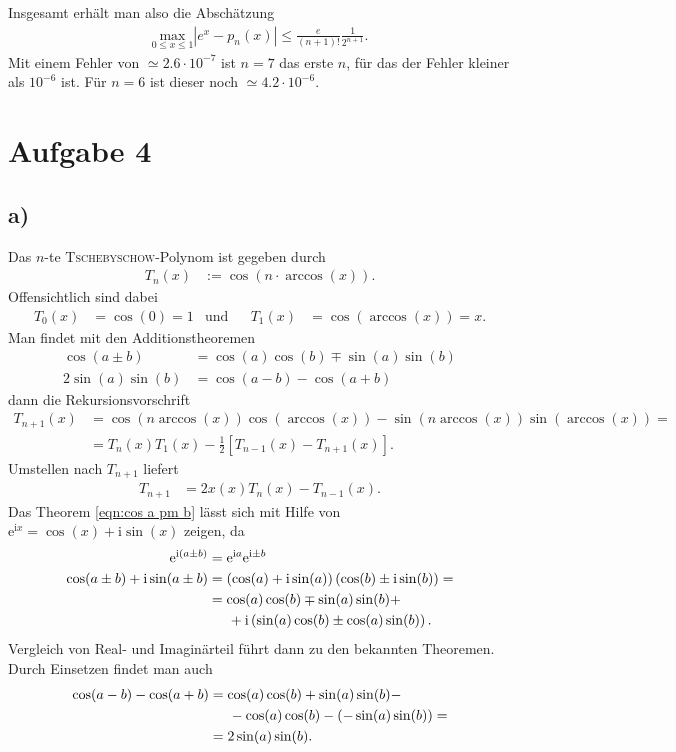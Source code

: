 \documentclass[english, parskip=full]{scrartcl}
\newcommand{\kla}{}
\newcommand{\klam}{}
\newcommand{\tecxt}{}
\renewcommand{\i}{\text{i}}
\newcommand{\e}{\text{e}}
\begin{document}
Insgesamt erhält man also die Abschätzung
\begin{align}
\underset{0\le x\le 1}{\tecxt\text{max}}\left\vert e^x-p_n(x)\right\vert\le\frac{e}{(n+1)!}\frac{1}{2^{n+1}}.
\end{align}
Mit einem Fehler von $\simeq 2.6\cdot 10^{-7}$ ist $n=7$ das erste $n$, für das der Fehler kleiner als $10^{-6}$ ist. 
Für $n=6$ ist dieser noch $\simeq 4.2\cdot 10^{-6}$.

\newpage
\section*{Aufgabe 4}
\subsection*{a)}
Das $n$-te \textsc{Tschebyschow}-Polynom ist gegeben durch
\begin{align}
T_n(x)&:=\cos\kla\left( n\cdot\arccos (x) \right).
\end{align}
Offensichtlich sind dabei
\begin{align}
T_0(x)&=\cos(0)=1&\tecxt\text{und}&&T_1(x)&=\cos(\arccos (x))=x.
\end{align}
Man findet mit den Additionstheoremen
\begin{align}
\cos(a\pm b)&=\cos(a)\cos(b)\mp\sin(a)\sin(b)\label{eqn:cos a pm b}\\
2\sin(a)\sin(b)&=\cos(a-b)-\cos(a+b)\label{eqn:2sin a sin b}
\end{align}
dann die Rekursionsvorschrift
\begin{align}
T_{n+1}(x)&=\cos\kla\left( n\arccos(x) \right)\cos(\arccos(x))-\sin\kla\left( n\arccos(x) \right)\sin(\arccos(x))=\\
&=T_{n}(x)T_1(x)-\frac{1}{2}\klam\left[ T_{n-1}(x)-T_{n+1}(x) \right].
\end{align}
Umstellen nach $T_{n+1}$ liefert
\begin{align}
T_{n+1}&=2x(x)T_n(x)-T_{n-1}(x).
\end{align}
Das Theorem \eqref{eqn:cos a pm b} lässt sich mit Hilfe von $\e^{\i x}=\cos(x)+\i\sin(x)$ zeigen, da
\begin{align}
\e^{\i (a\pm b)}&=\e^{\i a}\e^{\i \pm b}\\
\cos(a\pm b) + \i\sin(a\pm b)&=\kla\left( \cos(a)+\i\sin(a) \right)\kla\left( \cos(b)\pm \i\sin(b) \right)=\\
&=\cos(a)\cos(b)\mp\sin(a)\sin(b)+\\
&\hspace*{.5cm}+\i\kla\left( \sin(a)\cos(b)\pm\cos(a)\sin(b) \right).
\end{align}
Vergleich von Real- und Imaginärteil führt dann zu den bekannten Theoremen.
Durch Einsetzen findet man auch
\begin{align}
\cos(a-b)-\cos(a+b)&=\cos(a)\cos(b)+\sin(a)\sin(b)-\\
&\hspace*{.5cm}-\cos(a)\cos(b)-(-\sin(a)\sin(b))=\\
&=2\sin(a)\sin(b).
\end{align}
\end{document}
